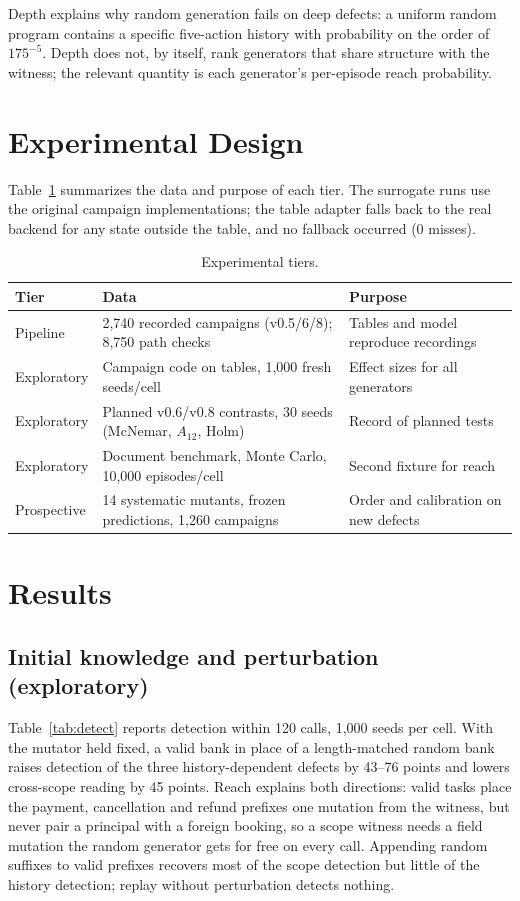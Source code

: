 \documentclass[conference]{IEEEtran}
\begin{document}
Depth explains why random generation fails on deep defects: a uniform random program
contains a specific five-action history with probability on the order of $175^{-5}$. Depth
does not, by itself, rank generators that share structure with the witness; the relevant
quantity is each generator's per-episode reach probability.

\section{Experimental Design}
\label{sec:design}
Table~\ref{tab:design} summarizes the data and purpose of each tier. The surrogate runs
use the original campaign implementations; the table adapter falls back to the real
backend for any state outside the table, and no fallback occurred (0 misses).

\begin{table}[t]
\caption{Experimental tiers.}
\label{tab:design}
\centering
\footnotesize
\begin{tabular}{@{}p{1.1cm}p{3.3cm}p{2.6cm}@{}}
\toprule
Tier & Data & Purpose \\
\midrule
Pipeline & 2{,}740 recorded campaigns (v0.5/6/8); 8{,}750 path checks & Tables and model reproduce recordings \\
Exploratory & Campaign code on tables, 1{,}000 fresh seeds/cell & Effect sizes for all generators \\
Exploratory & Planned v0.6/v0.8 contrasts, 30 seeds (McNemar, $A_{12}$, Holm) & Record of planned tests \\
Exploratory & Document benchmark, Monte Carlo, 10{,}000 episodes/cell & Second fixture for reach \\
Prospective & 14 systematic mutants, frozen predictions, 1{,}260 campaigns & Order and calibration on new defects \\
\bottomrule
\end{tabular}
\end{table}

\section{Results}
\subsection{Initial knowledge and perturbation (exploratory)}
Table~\ref{tab:detect} reports detection within 120 calls, 1{,}000 seeds per cell. With
the mutator held fixed, a valid bank in place of a length-matched random bank raises
detection of the three history-dependent defects by 43--76 points and lowers cross-scope
reading by 45 points. Reach explains both directions: valid tasks place the payment,
cancellation and refund prefixes one mutation from the witness, but never pair a principal
with a foreign booking, so a scope witness needs a field mutation the random generator
gets for free on every call. Appending random suffixes to valid prefixes recovers most of
the scope detection but little of the history detection; replay without perturbation
detects nothing.
\end{document}

